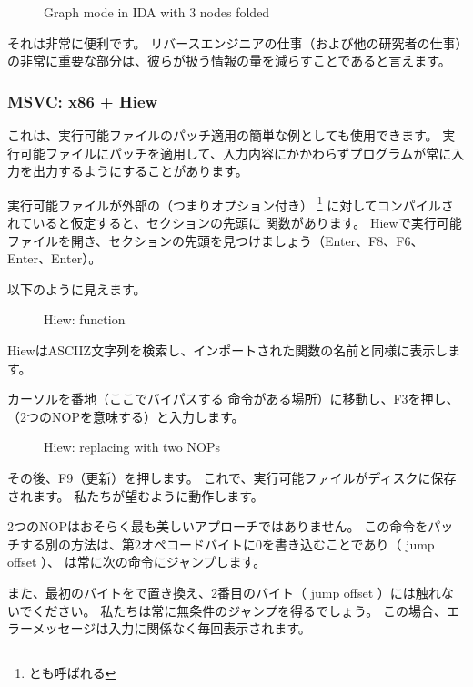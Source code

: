 \begin{figure}[H]
\centering
{}
\caption{Graph mode in IDA with 3 nodes folded}
\label{fig:ex3_IDA_2}
\end{figure}

それは非常に便利です。
リバースエンジニアの仕事（および他の研究者の仕事）の非常に重要な部分は、彼らが扱う情報の量を減らすことであると言えます。



\clearpage
\subsubsection{MSVC: x86 + Hiew}

これは、実行可能ファイルのパッチ適用の簡単な例としても使用できます。 
実行可能ファイルにパッチを適用して、入力内容にかかわらずプログラムが常に入力を出力するようにすることがあります。

実行可能ファイルが外部の（つまりオプション付き）
\footnote{とも呼ばれる}
に対してコンパイルされていると仮定すると、セクションの先頭に \main 関数があります。 
Hiewで実行可能ファイルを開き、セクションの先頭を見つけましょう（Enter、F8、F6、Enter、Enter）。 

以下のように見えます。

\begin{figure}[H]
\centering
{}
\caption{Hiew: \main function}
\label{fig:scanf_ex3_hiew_1}
\end{figure}

Hiewは\ac{ASCIIZ}文字列を検索し、インポートされた関数の名前と同様に表示します。

\clearpage
カーソルを番地（ここでバイパスする \JNZ 命令がある場所）に移動し、F3を押し、（2つの\ac{NOP}を意味する）と入力します。

\begin{figure}[H]
\centering
{}
\caption{Hiew: replacing  with two \ac{NOP}s}
\label{fig:scanf_ex3_hiew_2}
\end{figure}

その後、F9（更新）を押します。 これで、実行可能ファイルがディスクに保存されます。 私たちが望むように動作します。

2つの\ac{NOP}はおそらく最も美しいアプローチではありません。 
この命令をパッチする別の方法は、第2オペコードバイトに0を書き込むことであり（ \gls{jump offset} ）、 
\JNZ は常に次の命令にジャンプします。

また、最初のバイトをで置き換え、2番目のバイト（ \gls{jump offset} ）には触れないでください。 
私たちは常に無条件のジャンプを得るでしょう。 
この場合、エラーメッセージは入力に関係なく毎回表示されます。

